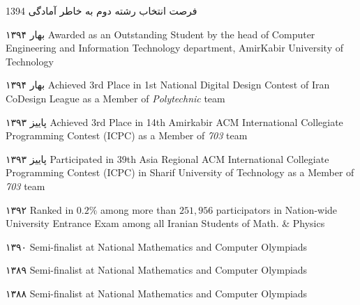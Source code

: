 \documentclass[]{friggeri-cv-fa} %
\begin{document}
\begin{entrylist}


\entry
{1394}
{{\normalfont فرصت انتخاب} \textcolor{TextGreen}{رشته دوم} {\normalfont به خاطر آمادگی}}
{}
{}


\entry
{بهار ۱۳۹۴}
{\normalfont Awarded as an Outstanding Student by the head of Computer Engineering and Information Technology department, AmirKabir University of Technology}
{}
{}


\entry
{بهار ۱۳۹۴}
{{\normalfont Achieved} \textcolor{TextYellow}{3rd} {\normalfont Place in 1st National Digital Design Contest of Iran CoDesign League as a Member of \emph{Polytechnic} team}}
{}
{}


\entry
{پاییز ۱۳۹۳}
{{\normalfont Achieved} \textcolor{UniBlue}{3rd} {\normalfont Place in 14th Amirkabir ACM International Collegiate Programming Contest (ICPC) as a Member of \emph{703} team}}
{}
{}


\entry
{پاییز ۱۳۹۳}
{\normalfont Participated in 39th Asia Regional ACM International Collegiate Programming Contest (ICPC) in Sharif University of Technology as a Member of \emph{703} team}
{}
{}


\entry
{۱۳۹۲}
{\normalfont Ranked in $0.2\%$ among more than $251,956$ participators in Nation-wide University Entrance Exam among all Iranian Students of Math. \& Physics}
{}
{}


\entry
{۱۳۹۰}
{\textcolor{TextOrange}{Semi-finalist} {\normalfont at National Mathematics and Computer Olympiads}}
{}
{}


\entry
{۱۳۸۹}
{\textcolor{TextOrange}{Semi-finalist} {\normalfont at National Mathematics and Computer Olympiads}}
{}
{}


\entry
{۱۳۸۸}
{\textcolor{TextOrange}{Semi-finalist} {\normalfont at National Mathematics and Computer Olympiads}}
{}
{}


\end{entrylist}
\end{document}
